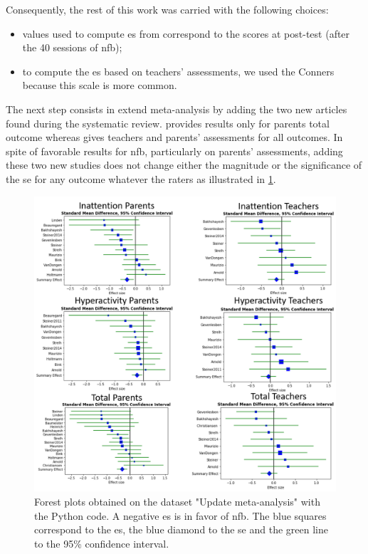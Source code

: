 Consequently, the rest of this work was carried with the following choices:
\begin{itemize}
    \item values used to compute \gls{es} from \citeauthor{Arnold2014} correspond to the scores at post-test (after the 40 sessions of \gls{nfb});  
    \item to compute the \gls{es} based on teachers' assessments, we used the Conners because this scale is more common.
\end{itemize}

The next step consists in extend \citeauthor{Cortese2016} meta-analysis by adding the two new articles \citep{Strehl2017, Baumeister2016} found 
during the systematic review. \citet{Baumeister2016} provides results only for parents total outcome whereas \citet{Strehl2017} gives teachers 
and parents' assessments for all outcomes. In spite of favorable results for \gls{nfb}, particularly on parents' assessments, adding these two 
new studies does not change either the magnitude or the significance of the \gls{se} for any outcome whatever the raters
as illustrated in \cref{Figure:meta_review_forest_plots_update_meta_analysis_our_choices_no_colors_2-columns_fitting_image}. 
 
\begin{figure}[h!]
  \centering
  \includegraphics[width=1.0\linewidth]{figures/meta_review_forest_plots_update_meta_analysis_our_choices_no_colors_2-columns_fitting_image}
  \caption{Forest plots obtained on the dataset "Update meta-analysis" with the Python code. A negative \gls{es} is in favor of \gls{nfb}. 
	The blue squares correspond to the \gls{es}, the blue diamond to the \gls{se} and the green line to the 95\% confidence interval.}
  \label{Figure:meta_review_forest_plots_update_meta_analysis_our_choices_no_colors_2-columns_fitting_image}
\end{figure}

